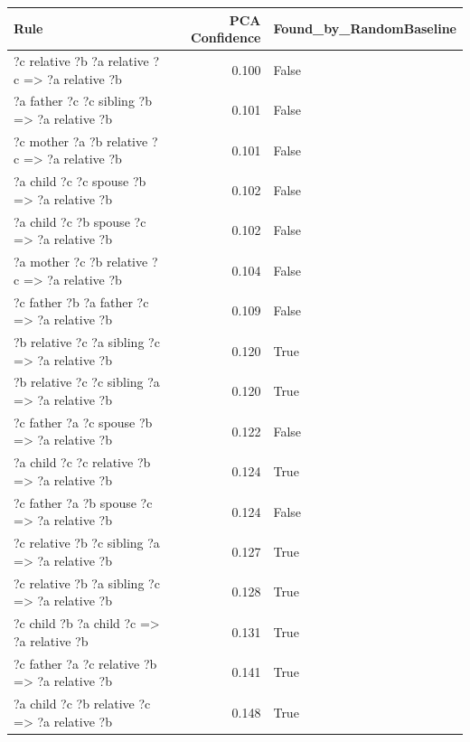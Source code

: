 \begin{longtable}{lrl}
\toprule
                                                    Rule &  PCA Confidence &  Found\_by\_RandomBaseline \\
\midrule
?c  relative  ?b  ?a  relative  ?c   => ?a  relative  ?b &           0.100 &                    False \\
   ?a  father  ?c  ?c  sibling  ?b   => ?a  relative  ?b &           0.101 &                    False \\
  ?c  mother  ?a  ?b  relative  ?c   => ?a  relative  ?b &           0.101 &                    False \\
     ?a  child  ?c  ?c  spouse  ?b   => ?a  relative  ?b &           0.102 &                    False \\
     ?a  child  ?c  ?b  spouse  ?c   => ?a  relative  ?b &           0.102 &                    False \\
  ?a  mother  ?c  ?b  relative  ?c   => ?a  relative  ?b &           0.104 &                    False \\
    ?c  father  ?b  ?a  father  ?c   => ?a  relative  ?b &           0.109 &                    False \\
 ?b  relative  ?c  ?a  sibling  ?c   => ?a  relative  ?b &           0.120 &                     True \\
 ?b  relative  ?c  ?c  sibling  ?a   => ?a  relative  ?b &           0.120 &                     True \\
    ?c  father  ?a  ?c  spouse  ?b   => ?a  relative  ?b &           0.122 &                    False \\
   ?a  child  ?c  ?c  relative  ?b   => ?a  relative  ?b &           0.124 &                     True \\
    ?c  father  ?a  ?b  spouse  ?c   => ?a  relative  ?b &           0.124 &                    False \\
 ?c  relative  ?b  ?c  sibling  ?a   => ?a  relative  ?b &           0.127 &                     True \\
 ?c  relative  ?b  ?a  sibling  ?c   => ?a  relative  ?b &           0.128 &                     True \\
      ?c  child  ?b  ?a  child  ?c   => ?a  relative  ?b &           0.131 &                     True \\
  ?c  father  ?a  ?c  relative  ?b   => ?a  relative  ?b &           0.141 &                     True \\
   ?a  child  ?c  ?b  relative  ?c   => ?a  relative  ?b &           0.148 &                     True \\

\end{longtable}

